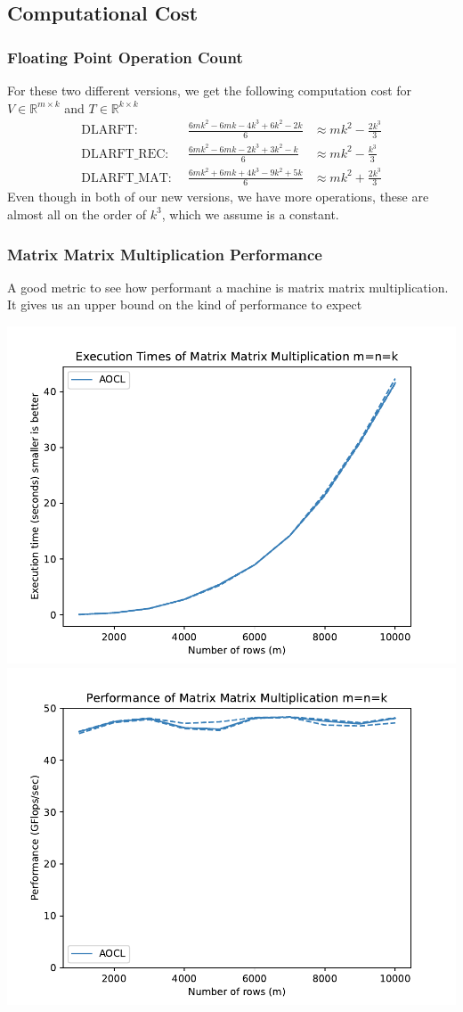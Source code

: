 \documentclass[12pt,aspectratio=169]{beamer}
\newcommand{\R}{\mathbb{R}}
\begin{document}
    \subsection{Computational Cost}
    \begin{frame}
        \frametitle{Floating Point Operation Count}
        For these two different versions, we get the following computation cost for $V\in\R^{m\times k}$ and  $T\in\R^{k\times k}$
        $$
        \begin{aligned}
            \text{DLARFT: }&\,      \frac{6mk^2 - 6mk -4k^3 +6k^2 - 2k}{6}&\approx mk^2 - \frac{2k^3}{3}\\
            \text{DLARFT\_REC: }&\, \frac{6mk^2 - 6mk -2k^3 +3k^2 -  k}{6}&\approx mk^2 - \frac{k^3}{3}\\
            \text{DLARFT\_MAT: }&\, \frac{6mk^2 + 6mk +4k^3 -9k^2 + 5k}{6}&\approx mk^2 + \frac{2k^3}{3}
        \end{aligned}
        $$
        Even though in both of our new versions, we have more operations, these are almost all on the order of $k^3$, 
        which we assume is a constant.
    \end{frame}
    \begin{frame}
        \frametitle{Matrix Matrix Multiplication Performance}
        A good metric to see how performant a machine is matrix matrix multiplication. It gives us an upper bound on the kind of performance to expect
        \begin{centering}
            \includegraphics[width=.45\textwidth]{figures/timeMMM.pdf}
            \includegraphics[width=.45\textwidth]{figures/flopMMM.pdf}
        \end{centering}
    \end{frame}
\end{document}
